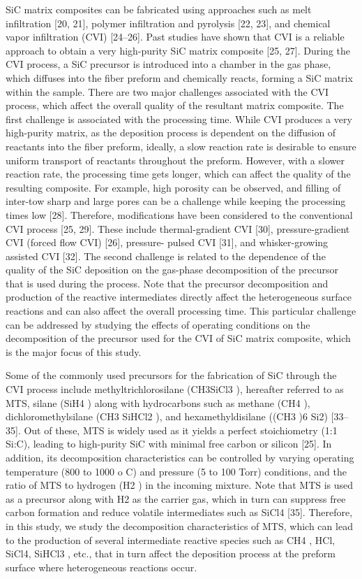 \documentclass[10pt, letterpaper]{article}
\begin{document}
SiC matrix composites can be fabricated using approaches such as melt infiltration [20, 21], polymer
infiltration and pyrolysis [22, 23], and chemical vapor infiltration (CVI) [24–26]. Past studies have shown
that CVI is a reliable approach to obtain a very high-purity SiC matrix composite [25, 27]. During the CVI
process, a SiC precursor is introduced into a chamber in the gas phase, which diffuses into the fiber preform
and chemically reacts, forming a SiC matrix within the sample. There are two major challenges associated
with the CVI process, which affect the overall quality of the resultant matrix composite. The first challenge
is associated with the processing time. While CVI produces a very high-purity matrix, as the deposition
process is dependent on the diffusion of reactants into the fiber preform, ideally, a slow reaction rate is
desirable to ensure uniform transport of reactants throughout the preform. However, with a slower reaction
rate, the processing time gets longer, which can affect the quality of the resulting composite. For example,
high porosity can be observed, and filling of inter-tow sharp and large pores can be a challenge while keeping
the processing times low [28]. Therefore, modifications have been considered to the conventional CVI process
[25, 29]. These include thermal-gradient CVI [30], pressure-gradient CVI (forced flow CVI) [26], pressure-
pulsed CVI [31], and whisker-growing assisted CVI [32]. The second challenge is related to the dependence
of the quality of the SiC deposition on the gas-phase decomposition of the precursor that is used during the
process. Note that the precursor decomposition and production of the reactive intermediates directly affect
the heterogeneous surface reactions and can also affect the overall processing time. This particular challenge
can be addressed by studying the effects of operating conditions on the decomposition of the precursor used
for the CVI of SiC matrix composite, which is the major focus of this study.

Some of the commonly used precursors for the fabrication of SiC through the CVI process include
methyltrichlorosilane (CH3SiCl3 ), hereafter referred to as MTS, silane (SiH4 ) along with hydrocarbons such
as methane (CH4 ), dichloromethylsilane (CH3 SiHCl2 ), and hexamethyldisilane ((CH3 )6 Si2) [33–35]. Out
of these, MTS is widely used as it yields a perfect stoichiometry (1:1 Si:C), leading to high-purity SiC
with minimal free carbon or silicon [25]. In addition, its decomposition characteristics can be controlled by
varying operating temperature (800 to 1000 o C) and pressure (5 to 100 Torr) conditions, and the ratio of
MTS to hydrogen (H2 ) in the incoming mixture. Note that MTS is used as a precursor along with H2 as
the carrier gas, which in turn can suppress free carbon formation and reduce volatile intermediates such as
SiCl4 [35]. Therefore, in this study, we study the decomposition characteristics of MTS, which can lead to
the production of several intermediate reactive species such as CH4 , HCl, SiCl4, SiHCl3 , etc., that in turn
affect the deposition process at the preform surface where heterogeneous reactions occur.
\end{document}
